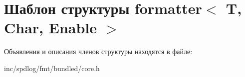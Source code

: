 \hypertarget{structformatter}{}\section{Шаблон структуры formatter$<$ T, Char, Enable $>$}
\label{structformatter}


Объявления и описания членов структуры находятся в файле\+:\begin{DoxyCompactItemize}
\item 
inc/spdlog/fmt/bundled/core.\+h\end{DoxyCompactItemize}
